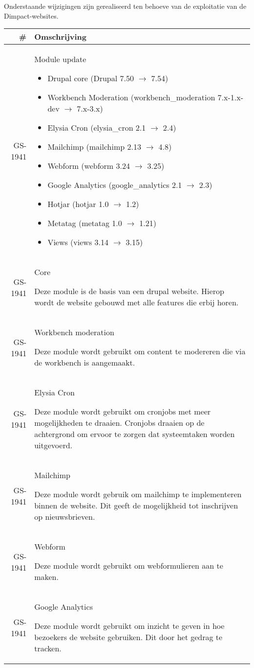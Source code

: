 \documentclass[12pt]{article}
\begin{document}
Onderstaande wijzigingen zijn gerealiseerd ten behoeve van de exploitatie van de Dimpact-websites.

\begin{tabular}{| r | p{15cm} |}
  \hline \# & Omschrijving \\ \hline
  GS-1941 & Module update
  \begin{itemize}
    \item Drupal core (Drupal 7.50 $\rightarrow$ 7.54)
    \item Workbench Moderation (workbench\_moderation 7.x-1.x-dev $\rightarrow$ 7.x-3.x)
    \item Elysia Cron (elysia\_cron 2.1 $\rightarrow$ 2.4)
    \item Mailchimp (mailchimp 2.13 $\rightarrow$ 4.8)
    \item Webform (webform 3.24 $\rightarrow$ 3.25)
    \item Google Analytics (google\_analytics 2.1 $\rightarrow$ 2.3)
    \item Hotjar (hotjar 1.0 $\rightarrow$ 1.2)
    \item Metatag (metatag 1.0 $\rightarrow$ 1.21)
    \item Views (views 3.14 $\rightarrow$ 3.15)
  \end{itemize} \\ \hline
  GS-1941 & Core

  Deze module is de basis van een drupal website. Hierop wordt de website gebouwd met alle features die erbij horen. \\ \hline
  GS-1941 & Workbench moderation

  Deze module wordt gebruikt om content te modereren die via de workbench is aangemaakt. \\ \hline
  GS-1941 & Elysia Cron

  Deze module wordt gebruikt om cronjobs met meer mogelijkheden te draaien. Cronjobs draaien op de achtergrond om ervoor te zorgen dat systeemtaken worden uitgevoerd. \\ \hline
  GS-1941 & Mailchimp

  Deze module wordt gebruik om mailchimp te implementeren binnen de website. Dit geeft de mogelijkheid tot inschrijven op nieuwsbrieven. \\ \hline
  GS-1941 & Webform

  Deze module wordt gebruikt om webformulieren aan te maken. \\ \hline
  GS-1941 & Google Analytics

  Deze module wordt gebruikt om inzicht te geven in hoe bezoekers de website gebruiken. Dit door het gedrag te tracken. \\ \hline


\end{tabular}
\end{document}
